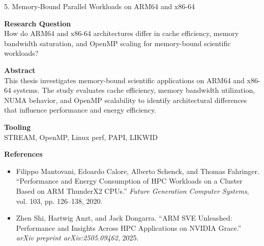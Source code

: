 \documentclass[aspectratio=169]{beamer}
\begin{document}
\begin{frame}{5. Memory-Bound Parallel Workloads on ARM64 and x86-64}
\small

\textbf{Research Question}\\
How do ARM64 and x86-64 architectures differ in cache efficiency, memory bandwidth saturation, and OpenMP scaling for memory-bound scientific workloads?

\vspace{0.35em}

\textbf{Abstract}\\
This thesis investigates memory-bound scientific applications on ARM64 and x86-64 systems. The study evaluates cache efficiency, memory bandwidth utilization, NUMA behavior, and OpenMP scalability to identify architectural differences that influence performance and energy efficiency.

\vspace{0.35em}

\textbf{Tooling}\\
STREAM, OpenMP, Linux perf, PAPI, LIKWID

\vspace{0.35em}

\textbf{References}
\begin{itemize}
\item Filippo Mantovani, Edoardo Calore, Alberto Schenck, and Thomas Fahringer. ``Performance and Energy Consumption of HPC Workloads on a Cluster Based on ARM ThunderX2 CPUs.'' \emph{Future Generation Computer Systems}, vol. 103, pp. 126--138, 2020.

\item Zhen Shi, Hartwig Anzt, and Jack Dongarra. ``ARM SVE Unleashed: Performance and Insights Across HPC Applications on NVIDIA Grace.'' \emph{arXiv preprint arXiv:2505.09462}, 2025.
\end{itemize}

\end{frame}

\end{document}
